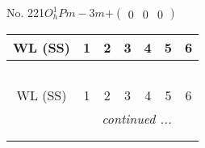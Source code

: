 \documentclass[fleqn,9pt,landscape]{jsarticle}
\begin{document}
\newpage
No. 221\quad$O_{h}^{1}$\quad$Pm-3m$\quad[ cubic ]\quad$+\begin{pmatrix} 0 & 0 & 0 \end{pmatrix}$
\begin{center}
\renewcommand{\arraystretch}{1.2}
\begin{longtable}{ccccccc}
 \hline \hline
WL (SS) & 1 & 2 & 3 & 4 & 5 & 6 \\ \hline \endfirsthead

\multicolumn{6}{l}{\tablename\ \thetable{}} \\
 \hline \hline
WL (SS) & 1 & 2 & 3 & 4 & 5 & 6 \\ \hline \endhead

 \hline \hline
\multicolumn{6}{r}{\footnotesize\it continued ...} \\ \endfoot

 \hline \hline
\multicolumn{6}{r}{} \\ \endlastfoot


\end{longtable}
\end{center}
\end{document}
